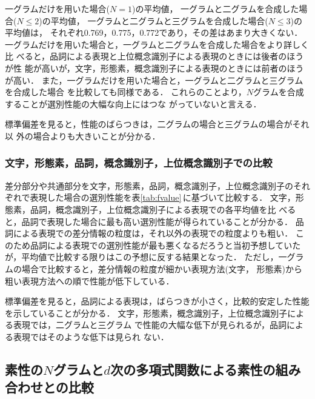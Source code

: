 一グラムだけを用いた場合($N = 1$)の平均値，
一グラムと二グラムを合成した場合($N \le 2$)の平均値，
一グラムと二グラムと三グラムを合成した場合($N \le 3$)の平均値は，
それぞれ0.769，0.775，0.772であり，その差はあまり大きくない．
一グラムだけを用いた場合と，一グラムと二グラムを合成した場合をより詳しく比
べると，品詞による表現と上位概念識別子による表現のときには後者のほうが性
能が高いが，文字，形態素，概念識別子による表現のときには前者のほうが高い．
また，一グラムだけを用いた場合と，一グラムと二グラムと三グラムを合成した場合
を比較しても同様である．
これらのことより，$N$グラムを合成することが選別性能の大幅な向上にはつな
がっていないと言える．

標準偏差を見ると，性能のばらつきは，二グラムの場合と三グラムの場合がそれ以
外の場合よりも大きいことが分かる．


\subsubsection{文字，形態素，品詞，概念識別子，上位概念識別子での比較}

差分部分や共通部分を文字，形態素，品詞，概念識別子，上位概念識別子のそれ
ぞれで表現した場合の選別性能を表\ref{tab:fvalue}\,に基づいて比較する．
文字，形態素，品詞，概念識別子，上位概念識別子による表現での各平均値を比
べると，品詞で表現した場合に最も高い選別性能が得られていることが分かる．
品詞による表現での差分情報の粒度は，それ以外の表現での粒度よりも粗い．
このため品詞による表現での選別性能が最も悪くなるだろうと当初予想していた
が，平均値で比較する限りはこの予想に反する結果となった．
ただし，一グラムの場合で比較すると，差分情報の粒度が細かい表現方法(文字，
形態素)から粗い表現方法への順で性能が低下している．

標準偏差を見ると，品詞による表現は，ばらつきが小さく，比較的安定した性能
を示していることが分かる． 
文字，形態素，概念識別子，上位概念識別子による表現では，二グラムと三グラム
で性能の大幅な低下が見られるが，品詞による表現ではそのような低下は見られ
ない．


\subsection{素性の$N$グラムと$d$次の多項式関数による素性の組み合わせとの比較}

